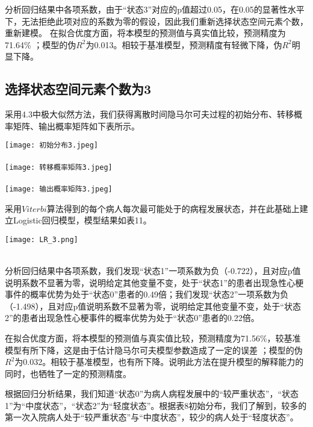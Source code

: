 \documentclass{article}
\begin{document}
分析回归结果中各项系数，由于“状态3”对应的p值超过0.05，在0.05的显著性水平下，无法拒绝此项对应的系数为零的假设，因此我们重新选择状态空间元素个数，重新建模。
在拟合优度方面，将本模型的预测值与真实值比较，预测精度为71.64\% ；模型的伪$R^2$为0.013。相较于基准模型，预测精度有轻微下降，伪$R^2$明显下降。


\subsection{选择状态空间元素个数为3}

采用4.3中极大似然方法，我们获得离散时间隐马尔可夫过程的初始分布、转移概率矩阵、输出概率矩阵如下表所示。
\begin{center}
\texttt{[image: 初始分布3.jpeg]}\\
\\
\texttt{[image: 转移概率矩阵3.jpeg]}\\
\\
\texttt{[image: 输出概率矩阵3.jpeg]}\\
\end{center}

采用$Viterbi$算法得到的每个病人每次最可能处于的病程发展状态，并在此基础上建立Logistic回归模型，模型结果如表11。

\begin{center}
\texttt{[image: LR\_3.png]}\\
\\
\end{center}

分析回归结果中各项系数，我们发现“状态1”一项系数为负（-0.722），且对应p值说明系数不显著为零，说明给定其他变量不变，处于“状态1”的患者出现急性心梗事件的概率优势为处于“状态0”患者的0.49倍；我们发现“状态2”一项系数为负（-1.498），且对应p值说明系数不显著为零，说明给定其他变量不变，处于“状态2”的患者出现急性心梗事件的概率优势为处于“状态0”患者的0.22倍。

在拟合优度方面，将本模型的预测值与真实值比较，预测精度为71.56\%，较基准模型有所下降，这是由于估计隐马尔可夫模型参数造成了一定的误差 ；模型的伪$R^2$为0.032。相较于基准模型，也有所下降。说明此方法在提升模型的解释能力的同时，也牺牲了一定的预测精度。

根据回归分析结果，我们知道“状态0”为病人病程发展中的“较严重状态”，“状态1”为“中度状态”，“状态2”为“轻度状态”。根据表8初始分布，我们了解到，较多的第一次入院病人处于“较严重状态”与“中度状态”，较少的病人处于“轻度状态”。
\end{document}
